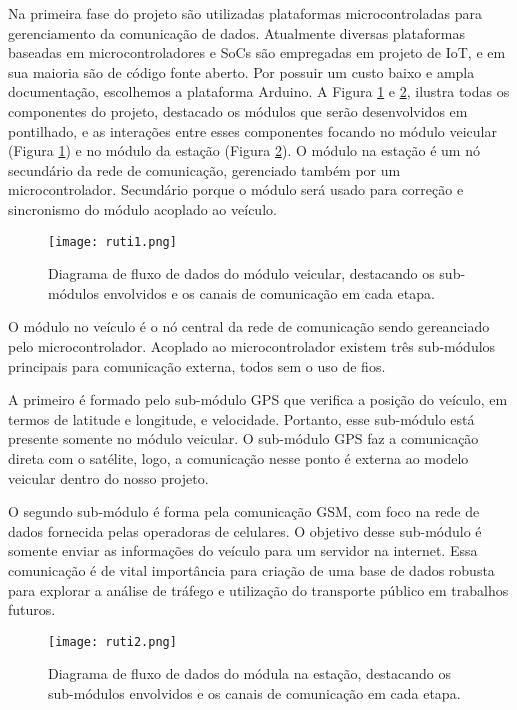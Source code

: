 \documentclass[12pt,cor2018]{uftpibic}
\begin{document}
Na primeira fase do projeto são utilizadas plataformas microcontroladas para gerenciamento da comunicação de dados. Atualmente diversas plataformas baseadas em microcontroladores e SoCs são empregadas em projeto de IoT, e em sua maioria são de código fonte aberto. Por possuir um custo baixo e ampla documentação, escolhemos a plataforma Arduino. A Figura \ref{fig:projeto1} e \ref{fig:projeto2}, ilustra todas os componentes do projeto, destacado os módulos que serão desenvolvidos em pontilhado, e as interações entre esses componentes focando no módulo veicular (Figura \ref{fig:projeto1}) e no módulo da estação (Figura \ref{fig:projeto2}). O módulo na estação é um nó secundário da rede de comunicação, gerenciado também por um microcontrolador. Secundário porque o módulo será usado para correção e sincronismo do módulo acoplado ao veículo.

\begin{figure}[!htpb]
\centering
\caption{Diagrama de fluxo de dados do módulo veicular, destacando os sub-módulos envolvidos e os canais de comunicação em cada etapa.}
\texttt{[image: ruti1.png]}
\label{fig:projeto1}
\end{figure}

O módulo no veículo é o nó central da rede de comunicação sendo gereanciado pelo microcontrolador. Acoplado ao microcontrolador existem três sub-módulos principais para comunicação externa, todos sem o uso de fios. 

A primeiro é formado pelo sub-módulo GPS que verifica a posição do veículo, em termos de latitude e longitude, e velocidade. Portanto, esse sub-módulo está presente somente no módulo veicular. O sub-módulo GPS faz a comunicação direta com o satélite, logo, a comunicação nesse ponto é externa ao modelo veicular dentro do nosso projeto. 

O segundo sub-módulo é forma pela comunicação GSM, com foco na rede de dados fornecida pelas operadoras de celulares. O objetivo desse sub-módulo é somente enviar as informações do veículo para um servidor na internet. Essa comunicação é de vital importância para criação de uma base de dados robusta para explorar a análise de tráfego e utilização do transporte público em trabalhos futuros.

\begin{figure}[!htpb]
\centering
\caption{Diagrama de fluxo de dados do módula na estação, destacando os sub-módulos envolvidos e os canais de comunicação em cada etapa.}
\texttt{[image: ruti2.png]}
\label{fig:projeto2}
\end{figure}
\end{document}
